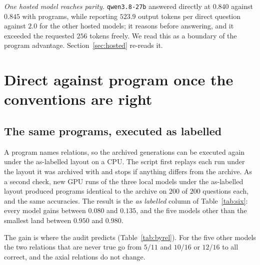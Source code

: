 \documentclass[11pt,a4paper]{article}
\newcommand{\code}[1]{\texttt{\small #1}}
\begin{document}
\emph{One hosted model reaches parity.} \code{qwen3.8-27b} answered directly
at $0.840$ against $0.845$ with programs, while reporting $523.9$ output
tokens per direct question against $2.0$ for the other hosted models; it
reasons before answering, and it exceeded the requested $256$ tokens freely.
We read this as a boundary of the program advantage. Section~\ref{sec:hosted}
re-reads it.

\section{Direct against program once the conventions are right}
\label{sec:aslabelled}

\subsection{The same programs, executed as labelled}
\label{sec:reexec}

A program names relations, so the archived generations can be executed again
under the as-labelled layout on a CPU. The script first replays each run
under the layout it was archived with and stops if anything differs from the
archive. As a second check, new GPU runs of the three local models under the
as-labelled layout produced programs identical to the archive on $200$ of
$200$ questions each, and the same accuracies. The result is the \emph{as
labelled} column of Table~\ref{tab:six}: every model gains between $0.080$
and $0.135$, and the five models other than the smallest land between $0.950$ and
$0.980$.

The gain is where the audit predicts (Table~\ref{tab:byrel}). For the five
other models the two relations that are never true go from $5/11$ and
$10/16$ or $12/16$ to all correct, and the axial relations do not change.
\end{document}
